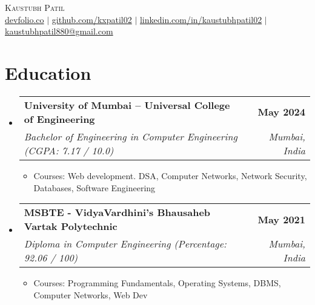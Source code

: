 \documentclass[letterpaper,11pt]{article}
\makeatletter
\newcommand{\resumeItem}[1]{
  \item\small{
    {#1 \vspace{-2pt}}
  }
}
\newcommand{\resumeSubheading}[4]{
  \vspace{-2pt}\item
    \begin{tabular*}{1.0\textwidth}[t]{l@{\extracolsep{\fill}}r}
      \vspace{-2pt}\textbf{#1} & \textbf{\small #2} \\
      \textit{\small#3} & \textit{\small #4} \\
    \end{tabular*}\vspace{-7pt}
}
\newcommand{\resumeSubHeadingListStart}{\begin{itemize}[leftmargin=0.0in, label={}]}
\newcommand{\resumeSubHeadingListEnd}{\end{itemize}}
\newcommand{\resumeItemListStart}{\begin{itemize}}
\newcommand{\resumeItemListEnd}{\end{itemize}\vspace{-5pt}}
\makeatother
\begin{document}

\begin{center}
    {\huge \scshape Kaustubh Patil} \\ \vspace{5pt}
    \small
    \href{https://devfolio.co/@kxpatil02}{devfolio.co} $|$ \href{https://github.com/kxpatil02}{github.com/kxpatil02} $|$ \href{https://www.linkedin.com/in/kaustubhpatil02/}{linkedin.com/in/kaustubhpatil02} $|$ \href{mailto:kaustubhpatil880@gmail.com}{kaustubhpatil880@gmail.com}
    \vspace{-8pt}
\end{center}


\section{Education}
    \resumeSubHeadingListStart
        \resumeSubheading
            {University of Mumbai --  Universal College of Engineering}{May 2024}
            {Bachelor of Engineering in Computer Engineering  (CGPA: 7.17  / 10.0)}{Mumbai, India}
            \resumeItemListStart
                \resumeItem{Courses:  Web development. DSA, Computer Networks, Network Security, Databases, Software Engineering}
            \resumeItemListEnd

        \resumeSubheading
            {MSBTE - VidyaVardhini’s Bhausaheb Vartak Polytechnic}{May 2021}
            {Diploma in Computer Engineering (Percentage: 92.06 / 100)}{Mumbai, India}
            \resumeItemListStart
                \resumeItem{Courses:  Programming Fundamentals, Operating Systems, DBMS, Computer Networks, Web Dev
                }
            \resumeItemListEnd
    \resumeSubHeadingListEnd
\vspace{-19pt}


\end{document}
